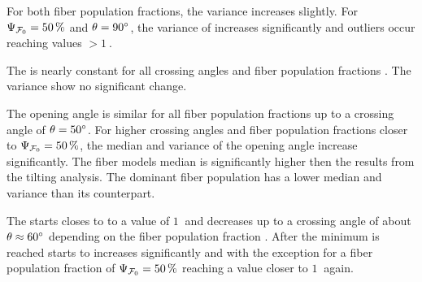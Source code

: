 For both fiber population fractions, the variance increases slightly.
For $\textnormal{$\Psi_{\textnormal{$\mathcal{F}_0$}}$} = \SI{50}{\percent}$ and $\textnormal{$\theta$} = \SI{90}{\degree}$, the variance of \trel{} increases significantly and outliers occur reaching \trel{} values $>\SI{1}{}$.
\par
The \rvalue{} is nearly constant for all crossing angles \modelOmega{} and fiber population fractions \modelPsi{}. The variance show no significant change.
\par
The opening angle \openingAngle{} is similar for all fiber population fractions up to a crossing angle of $\textnormal{$\theta$}=\SI{50}{\degree}$.
For higher crossing angles and fiber population fractions closer to $\textnormal{$\Psi_{\textnormal{$\mathcal{F}_0$}}$} = \SI{50}{\percent}$, the median and variance of the opening angle increase significantly.
The fiber models median \openingAngle{} is significantly higher then the results from the tilting analysis.
The dominant fiber population has a lower median and \bvariance{} variance than its counterpart.
\par
The \accvalue{} starts closes to to a value of $\SI{1}{}$ and decreases up to a crossing angle of about $\textnormal{$\theta$} \approx \SI{60}{\degree}$ depending on the fiber population fraction \modelPsi{}.
After the minimum is reached starts to increases significantly and with the exception for a fiber population fraction of $\textnormal{$\Psi_{\textnormal{$\mathcal{F}_0$}}$}=\SI{50}{\percent}$ reaching a value closer to $\SI{1}{}$ again.
% 
% 
%
